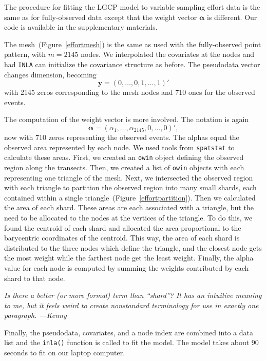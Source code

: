 \documentclass[]{interact}
\begin{document}
The procedure for fitting the LGCP model to variable sampling effort data is
the same as for fully-observed data except that the weight vector
\(\boldsymbol{\alpha}\) is different. Our code is available in the
supplementary materials.

The mesh~(Figure~\ref{effortmesh}) is the same as used with the fully-observed
point pattern, with \(m = 2145\) nodes. We interpolated the covariates
at the nodes and had \texttt{INLA} can initialize the covariance structure as
before. The pseudodata vector changes dimension, becoming
\begin{displaymath}
\mathbf{y} = (0, \dots, 0, 1, \dots, 1)'
\end{displaymath}
with 2145 zeros corresponding to the mesh nodes and 710 ones for the observed
events.

The computation of the weight vector is more involved. The notation is again
\begin{displaymath}
\boldsymbol{\alpha} = (\alpha_{1}, \dots, \alpha_{2145}, 0, \dots, 0)',
\end{displaymath}
now with 710 zeros representing the observed events. The alphas equal the
observed area represented by each node. We used tools from \texttt{spatstat}
to calculate these areas. First, we created an \texttt{owin} object defining
the observed region along the transects. Then, we created a list of
\texttt{owin} objects with each representing one triangle of the mesh. Next,
we intersected the observed region with each triangle to partition the observed
region into many small shards, each contained within a single
triangle~(Figure~\ref{effortpartition}). Then we calculated the area of each
shard. These areas are each associated with a triangle, but the need to be
allocated to the nodes at the vertices of the triangle. To do this, we found
the centroid of each shard and allocated the area proportional to the
barycentric coordinates of the centroid. This way, the area of each shard is
distributed to the three nodes which define the triangle, and the closest node
gets the most weight while the farthest node get the least weight. Finally,
the alpha value for each node is computed by summing the weights contributed
by each shard to that node.

{\it Is there a better (or more formal) term than ``shard''? It has an
intuitive meaning to me, but it feels weird to create nonstandard terminology
for use in exactly one paragraph. ---Kenny}

Finally, the pseudodata, covariates, and a node index are combined into a data
list and the \texttt{inla()} function is called to fit the model. The model
takes about 90 seconds to fit on our laptop computer.
\end{document}
